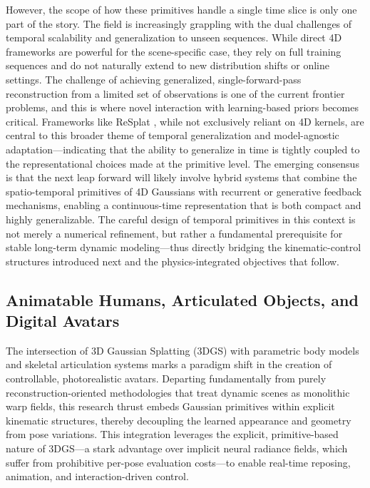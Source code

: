 \documentclass[11pt,a4paper]{article}
\begin{document}
However, the scope of how these primitives handle a single time slice is only one part of the story. The field is increasingly grappling with the dual challenges of temporal scalability and generalization to unseen sequences. While direct 4D frameworks are powerful for the scene-specific case, they rely on full training sequences and do not naturally extend to new distribution shifts or online settings. The challenge of achieving generalized, single-forward-pass reconstruction from a limited set of observations is one of the current frontier problems, and this is where novel interaction with learning-based priors becomes critical. Frameworks like ReSplat \cite{arxiv:2510.08575v3,arxiv:2602.22571v1}, while not exclusively reliant on 4D kernels, are central to this broader theme of temporal generalization and model-agnostic adaptation---indicating that the ability to generalize in time is tightly coupled to the representational choices made at the primitive level. The emerging consensus is that the next leap forward will likely involve hybrid systems that combine the spatio-temporal primitives of 4D Gaussians with recurrent or generative feedback mechanisms, enabling a continuous-time representation that is both compact and highly generalizable. The careful design of temporal primitives in this context is not merely a numerical refinement, but rather a fundamental prerequisite for stable long-term dynamic modeling---thus directly bridging the kinematic-control structures introduced next and the physics-integrated objectives that follow.


\subsection{Animatable Humans, Articulated Objects, and Digital Avatars}


The intersection of 3D Gaussian Splatting (3DGS) with parametric body models and skeletal articulation systems marks a paradigm shift in the creation of controllable, photorealistic avatars. Departing fundamentally from purely reconstruction-oriented methodologies that treat dynamic scenes as monolithic warp fields, this research thrust embeds Gaussian primitives within explicit kinematic structures, thereby decoupling the learned appearance and geometry from pose variations. This integration leverages the explicit, primitive-based nature of 3DGS---a stark advantage over implicit neural radiance fields, which suffer from prohibitive per-pose evaluation costs---to enable real-time reposing, animation, and interaction-driven control.
\end{document}
